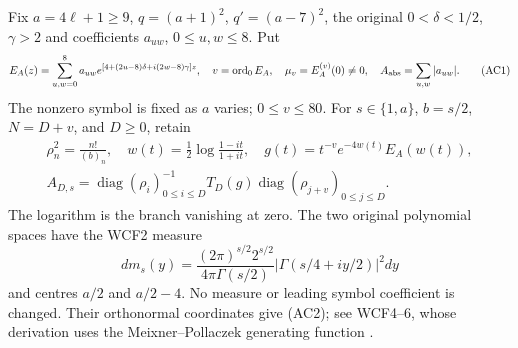 Fix $a=4\ell+1\ge9$, $q=(a+1)^2$, $q'=(a-7)^2$, the original
$0<\delta<1/2$, $\gamma>2$ and coefficients $a_{uw}$, $0\le u,w\le8$.
Put
\[
 E_A(z)=\sum_{u,w=0}^8 a_{uw}e^{[4+(2u-8)\delta+i(2w-8)\gamma]z},
 \quad v=\operatorname{ord}_0E_A,\quad \mu_v=E_A^{(v)}(0)\ne0,
 \quad A_{\rm abs}=\sum_{u,w}|a_{uw}|. \tag{AC1}
\]
The nonzero symbol is fixed as $a$ varies; $0\le v\le80$.
For $s\in\{1,a\}$, $b=s/2$, $N=D+v$, and $D\ge0$, retain
\[
 \begin{gathered}
 \rho_n^2=\frac{n!}{(b)_n},\quad
 w(t)=\tfrac12\log\frac{1-it}{1+it},\quad
 g(t)=t^{-v}e^{-4w(t)}E_A(w(t)),\\
 A_{D,s}=\operatorname{diag}(\rho_i)_{0\le i\le D}^{-1}
 T_D(g)\operatorname{diag}(\rho_{j+v})_{0\le j\le D}.
 \end{gathered}\tag{AC2}
\]
The logarithm is the branch vanishing at zero. The two original
polynomial spaces have the WCF2 measure
\[
 dm_s(y)=\frac{(2\pi)^{s/2}2^{s/2}}{4\pi\Gamma(s/2)}
 |\Gamma(s/4+iy/2)|^2dy
\]
and centres $a/2$ and $a/2-4$. No measure or leading symbol coefficient
is changed. Their orthonormal coordinates give (AC2); see WCF4--6,
whose derivation uses the Meixner--Pollaczek generating function
\cite[18.23.7]{hzoc:DLMF18}.

